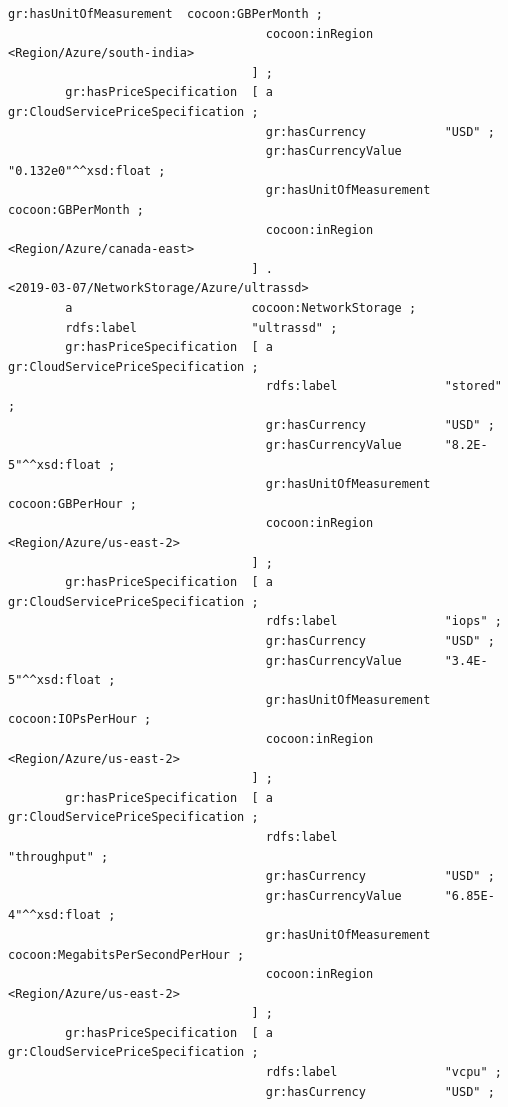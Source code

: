 \begin{lstlisting}[caption={Storage},label={lst:Storage}]
                                    gr:hasUnitOfMeasurement  cocoon:GBPerMonth ;
                                    cocoon:inRegion         <Region/Azure/south-india>
                                  ] ;
        gr:hasPriceSpecification  [ a                        gr:CloudServicePriceSpecification ;
                                    gr:hasCurrency           "USD" ;
                                    gr:hasCurrencyValue      "0.132e0"^^xsd:float ;
                                    gr:hasUnitOfMeasurement  cocoon:GBPerMonth ;
                                    cocoon:inRegion         <Region/Azure/canada-east>
                                  ] .
<2019-03-07/NetworkStorage/Azure/ultrassd>
        a                         cocoon:NetworkStorage ;
        rdfs:label                "ultrassd" ;
        gr:hasPriceSpecification  [ a                        gr:CloudServicePriceSpecification ;
                                    rdfs:label               "stored" ;
                                    gr:hasCurrency           "USD" ;
                                    gr:hasCurrencyValue      "8.2E-5"^^xsd:float ;
                                    gr:hasUnitOfMeasurement  cocoon:GBPerHour ;
                                    cocoon:inRegion         <Region/Azure/us-east-2>
                                  ] ;
        gr:hasPriceSpecification  [ a                        gr:CloudServicePriceSpecification ;
                                    rdfs:label               "iops" ;
                                    gr:hasCurrency           "USD" ;
                                    gr:hasCurrencyValue      "3.4E-5"^^xsd:float ;
                                    gr:hasUnitOfMeasurement  cocoon:IOPsPerHour ;
                                    cocoon:inRegion         <Region/Azure/us-east-2>
                                  ] ;
        gr:hasPriceSpecification  [ a                        gr:CloudServicePriceSpecification ;
                                    rdfs:label               "throughput" ;
                                    gr:hasCurrency           "USD" ;
                                    gr:hasCurrencyValue      "6.85E-4"^^xsd:float ;
                                    gr:hasUnitOfMeasurement  cocoon:MegabitsPerSecondPerHour ;
                                    cocoon:inRegion         <Region/Azure/us-east-2>
                                  ] ;
        gr:hasPriceSpecification  [ a                        gr:CloudServicePriceSpecification ;
                                    rdfs:label               "vcpu" ;
                                    gr:hasCurrency           "USD" ;

\end{lstlisting}
